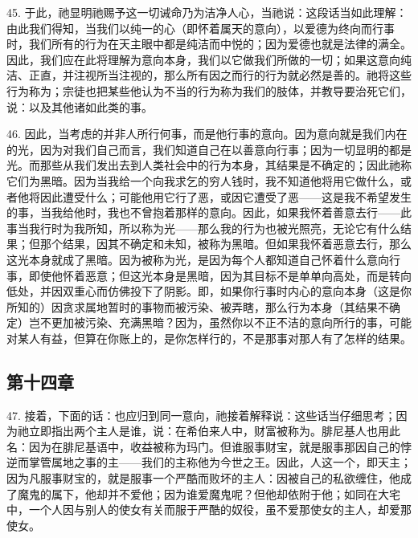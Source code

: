 45. 于此，祂显明祂赐予这一切诫命乃为洁净人心，当祂说：这段话当如此理解：由此我们得知，当我们以纯一的心（即怀着属天的意向），以爱德为终向而行事时，我们所有的行为在天主眼中都是纯洁而中悦的；因为爱德也就是法律的满全。因此，我们应在此将理解为意向本身，我们以它做我们所做的一切；如果这意向纯洁、正直，并注视所当注视的，那么所有因之而行的行为就必然是善的。祂将这些行为称为；宗徒也把某些他认为不当的行为称为我们的肢体，并教导要治死它们，说：以及其他诸如此类的事。\par

46. 因此，当考虑的并非人所行何事，而是他行事的意向。因为意向就是我们内在的光，因为对我们自己而言，我们知道自己在以善意向行事；因为一切显明的都是光。而那些从我们发出去到人类社会中的行为本身，其结果是不确定的；因此祂称它们为黑暗。因为当我给一个向我求乞的穷人钱时，我不知道他将用它做什么，或者他将因此遭受什么；可能他用它行了恶，或因它遭受了恶——这是我不希望发生的事，当我给他时，我也不曾抱着那样的意向。因此，如果我怀着善意去行——此事当我行时为我所知，所以称为光——那么我的行为也被光照亮，无论它有什么结果；但那个结果，因其不确定和未知，被称为黑暗。但如果我怀着恶意去行，那么这光本身就成了黑暗。因为被称为光，是因为每个人都知道自己怀着什么意向行事，即使他怀着恶意；但这光本身是黑暗，因为其目标不是单单向高处，而是转向低处，并因双重心而仿佛投下了阴影。即，如果你行事时内心的意向本身（这是你所知的）因贪求属地暂时的事物而被污染、被弄瞎，那么行为本身（其结果不确定）岂不更加被污染、充满黑暗？因为，虽然你以不正不洁的意向所行的事，可能对某人有益，但算在你账上的，是你怎样行的，不是那事对那人有了怎样的结果。\par


\subsection{第十四章}

47. 接着，下面的话：也应归到同一意向，祂接着解释说：这些话当仔细思考；因为祂立即指出两个主人是谁，说：在希伯来人中，财富被称为。腓尼基人也用此名：因为在腓尼基语中，收益被称为玛门。但谁服事财宝，就是服事那因自己的悖逆而掌管属地之事的主——我们的主称他为今世之王。因此，人这一个，即天主；因为凡服事财宝的，就是服事一个严酷而败坏的主人：因被自己的私欲缠住，他成了魔鬼的属下，他却并不爱他；因为谁爱魔鬼呢？但他却依附于他；如同在大宅中，一个人因与别人的使女有关而服于严酷的奴役，虽不爱那使女的主人，却爱那使女。\par

